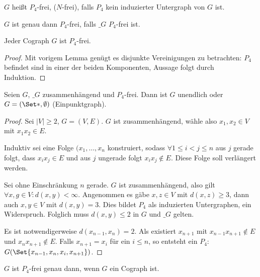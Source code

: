 
\begin{df}
    $G$ heißt $P_4$-frei, ($N$-frei), falls $P_4$ kein induzierter Untergraph von $G$ ist.
\end{df}

\begin{lem}
    $G$ ist genau dann $P_4$-frei, falls $\_G$ $P_4$-frei ist.
\end{lem}

\begin{kor}
    Jeder Cograph $G$ ist $P_4$-frei.
    \begin{proof}
        Mit vorigem Lemma genügt es disjunkte Vereinigungen zu betrachten: $P_4$ befindet sind in einer der beiden Komponenten, Aussage folgt durch Induktion.
    \end{proof}
\end{kor}

\begin{st}
    Seien $G$, $\_G$ zusammenhängend und $P_4$-frei.
    Dann ist $G$ unendlich oder $G = (\Set \ast, \emptyset)$ (Einpunktgraph).
    \begin{proof}
        Sei $|V| \ge 2$, $G = (V, E)$.
        $G$ ist zusammenhängend, wähle also $x_1, x_2 \in V$ mit $x_1x_2 \in E$.

        Induktiv sei eine Folge $(x_1, \dotsc, x_n$ konstruiert, sodass $\forall 1 \le i < j \le n$ aus $j$ gerade folgt, dass $x_ix_j \in E$ und aus $j$ ungerade folgt $x_ix_j \not\in E$.
        Diese Folge soll verlängert werden.

        Sei ohne Einschränkung $n$ gerade.
        $G$ ist zusammenhängend, also gilt $\forall x, g \in V: d(x,y) < \infty$.
        Angenommen es gäbe $x, z \in V$ mit $d(x,z) \ge 3$, dann auch $x,y \in V$ mit $d(x,y) = 3$.
        Dies bildet $P_4$ als induzierten Untergraphen, ein Widerspruch.
        Folglich muss $d(x,y) \le 2$ in $G$ und $\_G$ gelten.

        Es ist notwendigerweise $d(x_{n-1},x_n) = 2$.
        Als existiert $x_{n+1}$ mit $x_{n-1} x_{n+1} \not\in E$ und $x_n x_{n+1} \not\in E$.
        Falls $x_{n+1} = x_i$ für ein $i \le n$, so entsteht ein $P_4$: $G(\Set{x_{n-1}, x_n, x_i, x_{n+1}})$.
    \end{proof}
\end{st}

\begin{kor}
    $G$ ist $P_4$-frei genau dann, wenn $G$ ein Cograph ist.
\end{kor}


